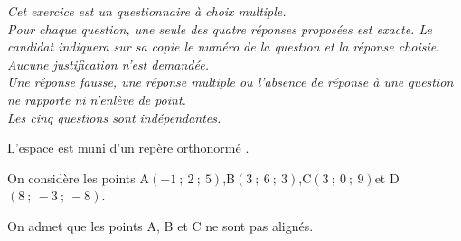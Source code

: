 \medskip

\emph{Cet exercice est un questionnaire à choix multiple.\\
Pour chaque question, une seule des quatre réponses proposées est exacte. Le candidat indiquera sur sa copie le numéro de la question et la réponse choisie. Aucune justification n'est demandée.\\
Une réponse fausse, une réponse multiple ou l'absence de réponse à une question ne rapporte ni n'enlève de point.\\
Les cinq questions sont indépendantes.}

\medskip

L'espace est muni d'un repère orthonormé \Oijk.

\smallskip

On considère les points A$(-1~;~2~;~5)$,\quad B$(3~;~6~;~3)$,\quad C$(3~;~0~;~9)$\quad et \quad D$(8~;~-3~;~-8)$.

On admet que les points A, B et C ne sont pas alignés.

